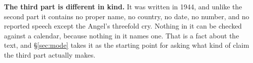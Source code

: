 \textbf{The third part is different in kind.} It was written in 1944,
and unlike the second part it contains no proper name, no country, no
date, no number, and no reported speech except the Angel's threefold
cry. Nothing in it can be checked against a calendar, because nothing
in it names one. That is a fact about the text, and
\S\ref{sec:mode} takes it as the starting point for asking what kind
of claim the third part actually makes.
